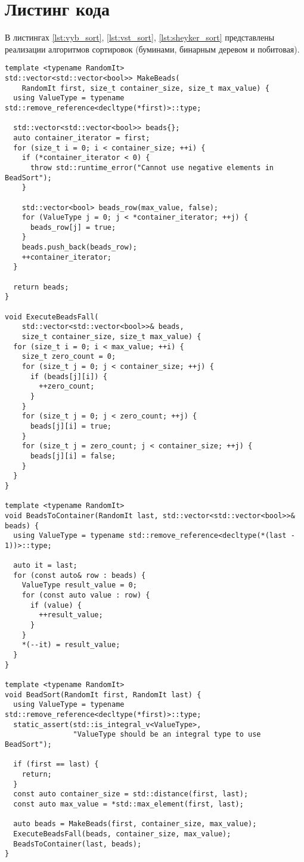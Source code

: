 \section{Листинг кода}
В листингах \ref{lst:vyb_sort}, \ref{lst:vst_sort}, \ref{lst:sheyker_sort}
представлены реализации алгоритмов сортировок (буминами, бинарным деревом и побитовая).

\begin{lstlisting}[label=lst:vyb_sort,caption=Алгоритм сортировки буминами]
template <typename RandomIt>
std::vector<std::vector<bool>> MakeBeads(
    RandomIt first, size_t container_size, size_t max_value) {
  using ValueType = typename std::remove_reference<decltype(*first)>::type;

  std::vector<std::vector<bool>> beads{};
  auto container_iterator = first;
  for (size_t i = 0; i < container_size; ++i) {
    if (*container_iterator < 0) {
      throw std::runtime_error("Cannot use negative elements in BeadSort");
    }

    std::vector<bool> beads_row(max_value, false);
    for (ValueType j = 0; j < *container_iterator; ++j) {
      beads_row[j] = true;
    }
    beads.push_back(beads_row);
    ++container_iterator;
  }

  return beads;
}

void ExecuteBeadsFall(
    std::vector<std::vector<bool>>& beads,
    size_t container_size, size_t max_value) {
  for (size_t i = 0; i < max_value; ++i) {
    size_t zero_count = 0;
    for (size_t j = 0; j < container_size; ++j) {
      if (beads[j][i]) {
        ++zero_count;
      }
    }
    for (size_t j = 0; j < zero_count; ++j) {
      beads[j][i] = true;
    }
    for (size_t j = zero_count; j < container_size; ++j) {
      beads[j][i] = false;
    }
  }
}

template <typename RandomIt>
void BeadsToContainer(RandomIt last, std::vector<std::vector<bool>>& beads) {
  using ValueType = typename std::remove_reference<decltype(*(last - 1))>::type;

  auto it = last;
  for (const auto& row : beads) {
    ValueType result_value = 0;
    for (const auto value : row) {
      if (value) {
        ++result_value;
      }
    }
    *(--it) = result_value;
  }
}

template <typename RandomIt>
void BeadSort(RandomIt first, RandomIt last) {
  using ValueType = typename std::remove_reference<decltype(*first)>::type;
  static_assert(std::is_integral_v<ValueType>,
                "ValueType should be an integral type to use BeadSort");

  if (first == last) {
    return;
  }
  const auto container_size = std::distance(first, last);
  const auto max_value = *std::max_element(first, last);

  auto beads = MakeBeads(first, container_size, max_value);
  ExecuteBeadsFall(beads, container_size, max_value);
  BeadsToContainer(last, beads);
}
\end{lstlisting}

